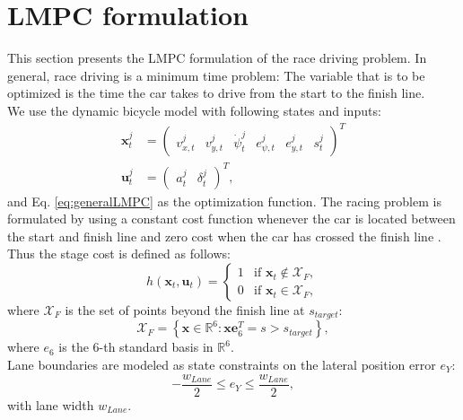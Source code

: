 \section{LMPC formulation}
This section presents the LMPC formulation of the race driving problem. In general, race driving is a minimum time problem: The variable that is to be optimized is the time the car takes to drive from the start to the finish line.\\
We use the dynamic bicycle model with following states and inputs:
\begin{align}
\bm{x}_t^j&=\begin{pmatrix}
v_{x,t}^j & v_{y,t}^j & \dot \psi_t^j & e_{\psi,t}^j & e_{y,t}^j & s_t^j
\end{pmatrix}^T\\
\bm{u}_t^j&=\begin{pmatrix}
a_t^j & \delta_t^j
\end{pmatrix}^T,
\end{align}
and Eq. \eqref{eq:generalLMPC} as the optimization function.
The racing problem is formulated by using a constant cost function whenever the car is located between the start and finish line and zero cost when the car has crossed the finish line \cite{Rosolia2016}. Thus the stage cost is defined as follows:
\begin{equation}
h(\bm{x}_t,\bm{u}_t)=\begin{cases}
1&\text{if }\bm{x}_t\not\in\mathcal{X}_F,\\
0&\text{if }\bm{x}_t\in\mathcal{X}_F,
\end{cases}
\end{equation}
where $\mathcal{X}_F$ is the set of points beyond the finish line at $s_{target}$:
\begin{equation}
\mathcal{X}_F=\left\{\bm{x}\in \mathbb{R}^6: \bm{xe}_6^T=s>s_{target}\right\},
\end{equation}
where $e_6$ is the 6-th standard basis in $\mathbb{R}^6$.\\
Lane boundaries are modeled as state constraints on the lateral position error $e_Y$:
\begin{equation}
-\frac{w_{Lane}}{2}\leq e_Y \leq \frac{w_{Lane}}{2},
\end{equation}
with lane width $w_{Lane}$.

